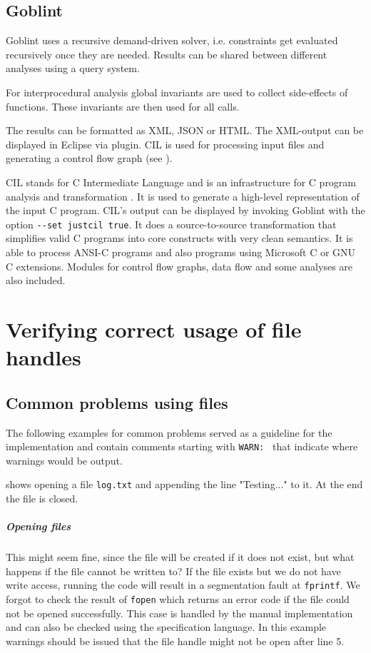 \section{Goblint}
Goblint uses a recursive demand-driven solver, i.e. constraints get evaluated recursively once they are needed. Results can be shared between different analyses using a query system.

For interprocedural analysis global invariants are used to collect side-effects of functions. These invariants are then used for all calls.

The results can be formatted as XML, JSON or HTML. The XML-output can be displayed in Eclipse via plugin. CIL is used for processing input files and generating a control flow graph (see ).

CIL stands for C Intermediate Language and is an infrastructure for C program analysis and transformation \cite{Necula:2002:CIL:647478.727796}. It is used to generate a high-level representation of the input C program. CIL's output can be displayed by invoking Goblint with the option \verb|--set justcil true|. It does a source-to-source transformation that simplifies valid C programs into core constructs with very clean semantics. It is able to process ANSI-C programs and also programs using Microsoft C or GNU C extensions. Modules for control flow graphs, data flow and some analyses are also included.



\chapter{Verifying correct usage of file handles}
\label{chap:file}
\section{Common problems using files}
The following examples for common problems served as a guideline for the implementation and contain comments starting with \verb|WARN: | that indicate where warnings would be output.

 shows opening a file \verb|log.txt| and appending the line "Testing..." to it. At the end the file is closed.

\paragraph*{Opening files}
This might seem fine, since the file will be created if it does not exist, but what happens if the file cannot be written to?
If the file exists but we do not have write access, running the code will result in a segmentation fault at \verb|fprintf|.
We forgot to check the result of \verb|fopen| which returns an error code if the file could not be opened successfully.
This case is handled by the manual implementation and can also be checked using the specification language. In this example warnings should be issued that the file handle might not be open after line 5.

